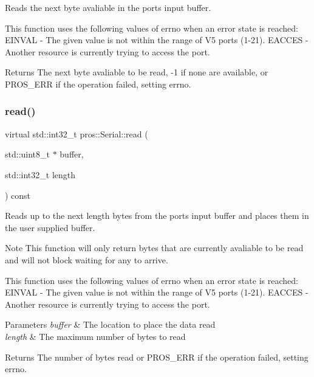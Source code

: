 Reads the next byte avaliable in the port\textquotesingle{}s input buffer. 

This function uses the following values of errno when an error state is reached\+: E\+I\+N\+V\+AL -\/ The given value is not within the range of V5 ports (1-\/21). E\+A\+C\+C\+ES -\/ Another resource is currently trying to access the port.

\begin{DoxyReturn}{Returns}
The next byte avaliable to be read, -\/1 if none are available, or P\+R\+O\+S\+\_\+\+E\+RR if the operation failed, setting errno. 
\end{DoxyReturn}
\mbox{\label{classpros_1_1Serial_a0d42f31fa7a5bd936010a346167c1946}} 
\subsubsection{\texorpdfstring{read()}{read()}}
{\footnotesize\ttfamily virtual std\+::int32\+\_\+t pros\+::\+Serial\+::read (\begin{DoxyParamCaption}\item[{std\+::uint8\+\_\+t $\ast$}]{buffer,  }\item[{std\+::int32\+\_\+t}]{length }\end{DoxyParamCaption}) const\hspace{0.3cm}{\ttfamily [virtual]}}



Reads up to the next length bytes from the port\textquotesingle{}s input buffer and places them in the user supplied buffer. 

\begin{DoxyNote}{Note}
This function will only return bytes that are currently avaliable to be read and will not block waiting for any to arrive.
\end{DoxyNote}
This function uses the following values of errno when an error state is reached\+: E\+I\+N\+V\+AL -\/ The given value is not within the range of V5 ports (1-\/21). E\+A\+C\+C\+ES -\/ Another resource is currently trying to access the port.


\begin{DoxyParams}{Parameters}
{\em buffer} & The location to place the data read \\
\hline
{\em length} & The maximum number of bytes to read\\
\hline
\end{DoxyParams}
\begin{DoxyReturn}{Returns}
The number of bytes read or P\+R\+O\+S\+\_\+\+E\+RR if the operation failed, setting errno. 
\end{DoxyReturn}
\mbox{\label{classpros_1_1Serial_a16477199d136d4f2ccbc73281d03965b}} 
